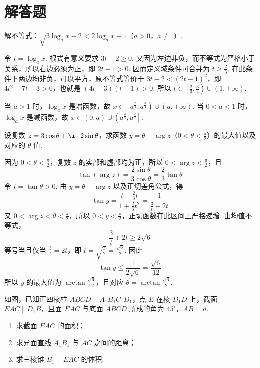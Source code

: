 \section{解答题}

\begin{problem}
解不等式：\(\sqrt{3\log_{a}x-2}<2\log_{a}x-1\)（\(a>0\)，\(a\neq 1\)）.
\end{problem}

\begin{solution}
令 \(t=\log_{a}x\). 根式有意义要求 \(3t-2\geqslant 0\). 又因为左边非负，而不等式为严格小于关系，所以右边必须为正，即 \(2t-1>0\). 因而定义域条件可合并为 \(t\geqslant\frac{2}{3}\). 在此条件下两边均非负，可以平方，原不等式等价于 \(3t-2<(2t-1)^2\)，即 \(4t^2-7t+3>0\)，也就是 \((4t-3)(t-1)>0\). 所以 \(t\in\left[\frac{2}{3},\frac{3}{4}\right)\cup(1,+\infty)\).

当 \(a>1\) 时，\(\log_a x\) 是增函数，故 \(x\in\left[a^{\frac{2}{3}},a^{\frac{3}{4}}\right)\cup(a,+\infty)\). 当 \(0<a<1\) 时，\(\log_a x\) 是减函数，故 \(x\in(0,a)\cup\left(a^{\frac{3}{4}},a^{\frac{2}{3}}\right]\).
\end{solution}

\begin{problem}
设复数 \(z=3\cos\theta+\i\cdot 2\sin\theta\)，求函数 \(y=\theta-\arg z\)（\(0<\theta<\frac{\pi}{2}\)）的最大值以及对应的 \(\theta\) 值.
\end{problem}

\begin{solution}
因为 \(0<\theta<\frac{\pi}{2}\)，复数 \(z\) 的实部和虚部均为正，所以
\(0<\arg z<\frac{\pi}{2}\)，且
\[
\tan(\arg z)=\frac{2\sin\theta}{3\cos\theta}=\frac{2}{3}\tan\theta
\]
令 \(t=\tan\theta>0\). 由 \(y=\theta-\arg z\) 以及正切差角公式，得
\[
\tan y=\frac{t-\frac{2}{3}t}{1+\frac{2}{3}t^2}=\frac{1}{\frac{3}{t}+2t}
\]
又 \(0<\arg z<\theta<\frac{\pi}{2}\)，所以 \(0<y<\frac{\pi}{2}\)，正切函数在此区间上严格递增. 由均值不等式，
\[
\frac{3}{t}+2t\geqslant2\sqrt{6}
\]
等号当且仅当 \(\frac{3}{t}=2t\)，即 \(t=\sqrt{\frac{3}{2}}=\frac{\sqrt{6}}{2}\). 因此
\[
\tan y\leqslant\frac{1}{2\sqrt{6}}=\frac{\sqrt{6}}{12}
\]
所以 \(y\) 的最大值为 \(\arctan\frac{\sqrt{6}}{12}\)，且对应
\(\theta=\arctan\frac{\sqrt{6}}{2}\).
\end{solution}

\begin{problem}
如图，已知正四棱柱 \(ABCD-A_{1}B_{1}C_{1}D_{1}\)，点 \(E\) 在棱 \(D_{1}D\) 上，截面 \(EAC\parallel D_{1}B\)，且面 \(EAC\) 与底面 \(ABCD\) 所成的角为 \(45^{\circ}\)，\(AB=a\).

\begin{enumerate}
\item 求截面 \(EAC\) 的面积；
\item 求异面直线 \(A_{1}B_{1}\) 与 \(AC\) 之间的距离；
\item 求三棱锥 \(B_{1}-EAC\) 的体积.
\end{enumerate}

\end{problem}

